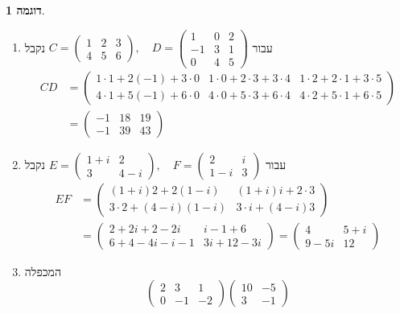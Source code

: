 \documentclass[12pt]{report}
\theoremstyle{plain}
\theoremstyle{definition}
\newtheorem{example}{דוגמה}[chapter]
\newcommand{\0}{\mathbf{0}}
\begin{document}
\begin{example}
\begin{enumerate}[label=\alph*.]
\item 
עבור
$
C=\begin{pmatrix}
1 & 2 & 3 \\
4 & 5 & 6
\end{pmatrix},\quad D=
\begin{pmatrix}
1 & 0 & 2 \\
-1 & 3 & 1 \\
0 & 4 & 5
\end{pmatrix}
$
נקבל
$$
\begin{aligned}
CD&=
\begin{pmatrix}
1\cdot1 + 2(-1) + 3\cdot0 & 1\cdot0 + 2\cdot3 + 3\cdot4 & 1\cdot2 + 2\cdot 1 + 3\cdot5 \\
4\cdot1 + 5(-1) + 6\cdot0 & 4\cdot0 + 5\cdot3 + 6\cdot4 & 4\cdot2 + 5\cdot1 + 6\cdot5
\end{pmatrix}\\
&=
\begin{pmatrix}
-1 & 18 & 19 \\
-1 & 39 & 43
\end{pmatrix}
\end{aligned}
$$


\item
עבור 
$E=\begin{pmatrix}
1+i & 2 \\
3 & 4-i
\end{pmatrix}, \quad
F=\begin{pmatrix}
2 & i \\
1-i & 3
\end{pmatrix}$
נקבל
$$
\begin{aligned}
EF&=\begin{pmatrix}
(1+i)2 + 2(1-i) & (1+i)i + 2\cdot3 \\
3\cdot2 + (4-i)(1-i) & 3\cdot i + (4-i)3
\end{pmatrix}\\
&=
\begin{pmatrix}
2+2i + 2 - 2i & i - 1 + 6 \\
6 + 4 - 4i - i - 1 & 3i + 12 - 3i
\end{pmatrix}=
\begin{pmatrix}
4 & 5 + i \\
9 - 5i & 12
\end{pmatrix}
\end{aligned}
$$


\item 

המכפלה
$$
\begin{pmatrix}
2 &3 &1 \\
0 &-1 &-2
\end{pmatrix}
\begin{pmatrix}
10 &-5 \\
3 &-1 
\end{pmatrix}
$$


\end{enumerate}
\end{example}
\end{document}
